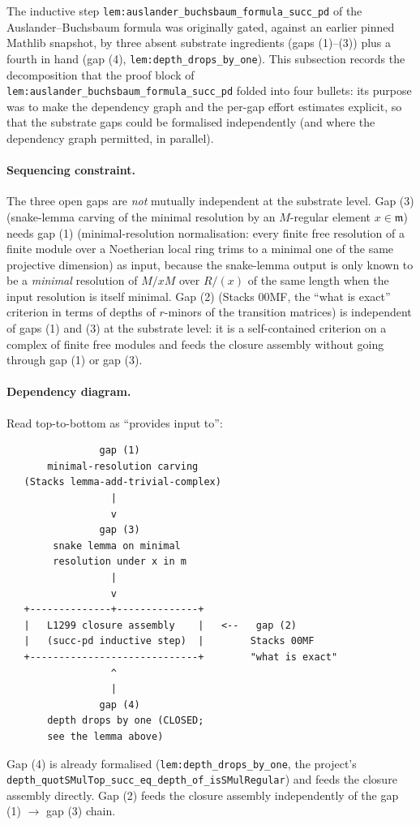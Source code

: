 \medskip
The inductive step
\texttt{lem:auslander_buchsbaum_formula_succ_pd}
of the Auslander--Buchsbaum formula was originally gated, against an
earlier pinned Mathlib snapshot, by three absent substrate ingredients
(gaps (1)--(3)) plus a fourth in hand
(gap (4), \texttt{lem:depth_drops_by_one}). This subsection records the
decomposition that the proof block of
\texttt{lem:auslander_buchsbaum_formula_succ_pd} folded into four bullets:
its purpose was to make the dependency graph and the per-gap effort
estimates explicit, so that the substrate gaps could be formalised
independently (and where the dependency graph permitted, in parallel).

\paragraph{Sequencing constraint.} The three open gaps are
\emph{not} mutually independent at the substrate level. Gap (3)
(snake-lemma carving of the minimal resolution by an
\(M\)-regular element \(x \in \mathfrak m\)) needs gap (1)
(minimal-resolution normalisation: every finite free resolution of
a finite module over a Noetherian local ring trims to a minimal one
of the same projective dimension) as input, because the snake-lemma
output is only known to be a \emph{minimal} resolution of \(M/xM\)
over \(R/(x)\) of the same length when the input resolution is itself
minimal. Gap (2) (Stacks 00MF, the ``what is exact'' criterion in
terms of depths of \(r\)-minors of the transition matrices) is
independent of gaps (1) and (3) at the substrate level: it is a
self-contained criterion on a complex of finite free modules and
feeds the closure assembly without going through gap (1) or gap (3).

\paragraph{Dependency diagram.} Read top-to-bottom as ``provides
input to'':
\begin{verbatim}
                gap (1)
       minimal-resolution carving
   (Stacks lemma-add-trivial-complex)
                  |
                  v
                gap (3)
        snake lemma on minimal
        resolution under x in m
                  |
                  v
   +--------------+--------------+
   |   L1299 closure assembly    |   <--   gap (2)
   |   (succ-pd inductive step)  |        Stacks 00MF
   +-----------------------------+        "what is exact"
                  ^
                  |
                gap (4)
       depth drops by one (CLOSED;
       see the lemma above)
\end{verbatim}
Gap (4) is already formalised
(\texttt{lem:depth_drops_by_one}, the project's
\texttt{depth\_quotSMulTop\_succ\_eq\_depth\_of\_isSMulRegular})
and feeds the closure assembly directly. Gap (2) feeds the closure
assembly independently of the gap (1) \(\to\) gap (3) chain.

